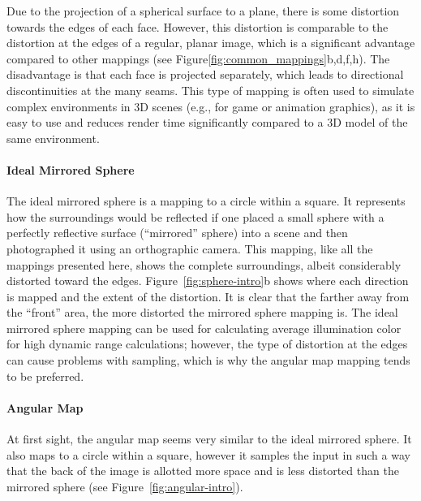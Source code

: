 Due to the projection of a spherical surface to a plane, there is some distortion towards the edges of each face. However, this distortion is comparable to the distortion at the edges of a regular, planar image, which is a significant advantage compared to other mappings (see Figure\ref{fig:common_mappings}b,d,f,h\footnotemark). The disadvantage is that each face is projected separately, which leads to directional discontinuities at the many seams. This type of mapping is often used to simulate complex environments in 3D scenes (e.g., for game or animation graphics), as it is easy to use and reduces render time significantly compared to a 3D model of the same environment.

\cite[p. 540]{hdrbook}

\paragraph{Ideal Mirrored Sphere}
The ideal mirrored sphere is a mapping to a circle within a square. It represents how the surroundings would be reflected if one placed a small sphere with a perfectly reflective surface (``mirrored'' sphere) into a scene and then photographed it using an orthographic camera. This mapping, like all the mappings presented here, shows the complete surroundings, albeit considerably distorted toward the edges. Figure~\ref{fig:sphere-intro}b shows where each direction is mapped and the extent of the distortion. It is clear that the farther away from the ``front'' area, the more distorted the mirrored sphere mapping is. The ideal mirrored sphere mapping can be used for calculating average illumination color for high dynamic range calculations; however, the type of distortion at the edges can cause problems with sampling, which is why the angular map mapping tends to be preferred.
\cite[p. 535]{hdrbook}

\paragraph{Angular Map}
At first sight, the angular map seems very similar to the ideal mirrored sphere. It also maps to a circle within a square, however it samples the input in such a way that the back of the image is allotted more space and is less distorted than the mirrored sphere (see Figure~\ref{fig:angular-intro}).
\cite[p. 537]{hdrbook}


